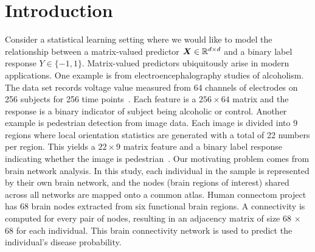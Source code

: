 \documentclass[11pt]{article}
\theoremstyle{definition}
\begin{document}
\vspace{-.5cm}
\section{Introduction }
\vspace{-.3cm}
Consider a statistical learning setting where we would like to model the relationship between a matrix-valued predictor $\bm X \in \mathbb{R}^{d\times d}$ and a binary label response $Y\in\{-1,1\}$. Matrix-valued predictors ubiquitously arise in modern applications. One example is from electroencephalography studies of alcoholism. The data set records voltage value measured from 64 channels of electrodes on 256 subjects for 256 time points~\citep{zhou2014regularized}. Each feature is a $256\times 64$ matrix and the response is a binary indicator of subject being alcoholic or control. Another example is pedestrian detection from image data. Each image is divided into 9 regions where local orientation statistics are generated with a total of 22 numbers per region. This yields a $22 \times 9$ matrix feature and a binary label response indicating whether the image is pedestrian~\citep{Shashua2004Pedestrian}.  Our motivating problem  comes from brain network analysis. In this study, each individual in the sample is represented by their own brain network, and the nodes (brain regions of interest) shared across all networks are mapped onto a common atlas. Human connectom project~\citep{wang2017bayesian} has 68 brain nodes extracted from six functional brain regions. A connectivity is computed for every pair of nodes, resulting in an adjacency matrix of size 68 $\times$ 68 for each individual. This brain connectivity network is used to predict the individual's disease probability. 

\end{document}
